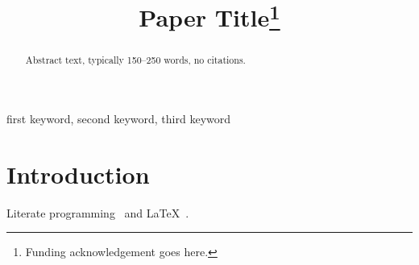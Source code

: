 \documentclass[conference]{IEEEtran}
\begin{document}
\title{Paper Title\thanks{Funding acknowledgement goes here.}}
\author{
\and
{}
}
\maketitle
\begin{abstract}
Abstract text, typically 150--250 words, no citations.
\end{abstract}
\begin{IEEEkeywords}
first keyword, second keyword, third keyword
\end{IEEEkeywords}
\section{Introduction}
Literate programming~\cite{knuth1984literate} and \LaTeX~\cite{lamport1994latex}.


\end{document}

